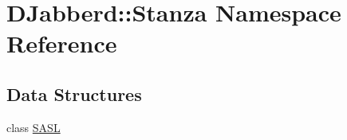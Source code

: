 \hypertarget{namespace_d_jabberd_1_1_stanza}{
\section{\-D\-Jabberd\-:\-:\-Stanza \-Namespace \-Reference}
\label{namespace_d_jabberd_1_1_stanza}
}
\subsection*{\-Data \-Structures}
\begin{DoxyCompactItemize}
\item 
class \hyperlink{class_d_jabberd_1_1_stanza_1_1_s_a_s_l}{\-S\-A\-S\-L}
\end{DoxyCompactItemize}
